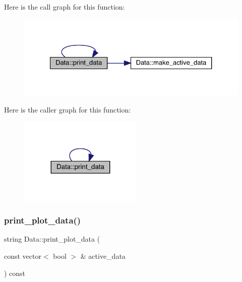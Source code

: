 Here is the call graph for this function\+:
\nopagebreak
\begin{figure}[H]
\begin{center}
\leavevmode
\includegraphics[width=327pt]{d0/df3/classData_a255a7abe193d5dfbd77fb957942bda64_cgraph}
\end{center}
\end{figure}
Here is the caller graph for this function\+:
\nopagebreak
\begin{figure}[H]
\begin{center}
\leavevmode
\includegraphics[width=167pt]{d0/df3/classData_a255a7abe193d5dfbd77fb957942bda64_icgraph}
\end{center}
\end{figure}
\mbox{\label{classData_a9dd9812c56754c985d50e9a5fc855320}} 
\subsubsection{\texorpdfstring{print\_plot\_data()}{print\_plot\_data()}\hspace{0.1cm}{\footnotesize\ttfamily [1/2]}}
{\footnotesize\ttfamily string Data\+::print\+\_\+plot\+\_\+data (\begin{DoxyParamCaption}\item[{const vector$<$ bool $>$ \&}]{active\+\_\+data }\end{DoxyParamCaption}) const}

